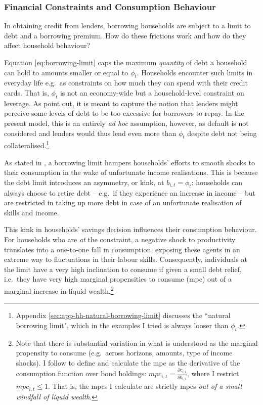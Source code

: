 \documentclass[a4paper,12pt]{article} %
\numberwithin{equation}{section} %
\numberwithin{figure}{section}
\numberwithin{table}{section}
\begin{document}
\subsubsection{Financial Constraints and Consumption Behaviour}
\label{sec:model-hh-constraints}

In obtaining credit from lenders, borrowing households are subject to a limit to debt and a borrowing premium. How do these frictions work and how do they affect household behaviour?

Equation \eqref{eq:borrowing-limit} caps the maximum \textit{quantity} of debt a household can hold to amounts smaller or equal to $\phi_t$. Households encounter such limits in everyday life e.g.~as constraints on how much they can spend with their credit cards. That is, $\phi_t$ is not an economy-wide but a household-level constraint on leverage. As \textcite{egg2012} point out, it is meant to capture the notion that lenders might perceive some levels of debt to be too excessive for borrowers to repay. In the present model, this is an entirely \textit{ad hoc} assumption, however, as default is not considered and lenders would thus lend even more than $\phi_t$ despite debt not being collateralised.\footnote{Appendix \ref{sec:app-hh-natural-borrowing-limit} discusses the ``natural borrowing limit", which in the examples I tried is always looser than $\phi_t$.}

As stated in \textcite{carroll2021}, a borrowing limit hampers households' efforts to smooth shocks to their consumption in the wake of unfortunate income realisations. This is because the debt limit introduces an asymmetry, or kink, at $b_{i,t} = \phi_t$: households can always choose to retire debt -- e.g.~if they experience an increase in income -- but are restricted in taking up more debt in case of an unfortunate realisation of skills and income. 

This kink in households' savings decision influences their consumption behaviour. For households who are \textit{at} the constraint, a negative shock to productivity translates into a one-to-one fall in consumption, exposing these agents in an extreme way to fluctuations in their labour skills. Consequently, individuals at the limit have a very high inclination to consume if given a small debt relief, i.e.~they have very high marginal propensities to consume (\Gls{mpc}) out of a marginal increase in liquid wealth.\footnote{Note that there is substantial variation in what is understood as the marginal propensity to consume (e.g.~across horizons, amounts, type of income shocks). I follow \textcite{gl2017} to define and calculate the \Gls{mpc} as the derivative of the consumption function over bond holdings: $mpc_{i,t} = \frac{\partial c_{i,t}}{\partial b_{i,t}}$, where I restrict $mpc_{i,t} \le 1$. That is, the \Gls{mpc}s I calculate are strictly \Gls{mpc}s \textit{out of a small windfall of liquid wealth}.}
\end{document}
